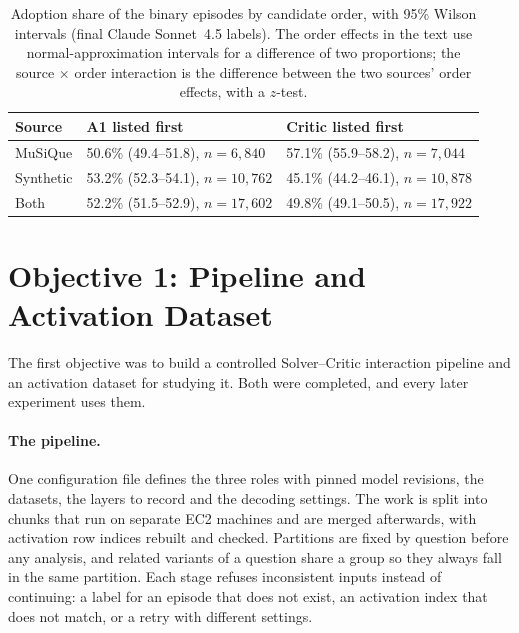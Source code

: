 \begin{table}[htbp]
    \centering
    \caption{Adoption share of the binary episodes by candidate order, with
    95\% Wilson intervals (final Claude Sonnet~4.5 labels). The order effects
    in the text use normal-approximation intervals for a difference of two
    proportions; the source $\times$ order interaction is the difference
    between the two sources' order effects, with a $z$-test.}
    \label{tab:order-final}
    \begin{tabular}{lll}
        \toprule
        Source & A1 listed first & Critic listed first \\
        \midrule
        MuSiQue   & 50.6\% (49.4--51.8), $n = 6{,}840$  & 57.1\% (55.9--58.2), $n = 7{,}044$ \\
        Synthetic & 53.2\% (52.3--54.1), $n = 10{,}762$ & 45.1\% (44.2--46.1), $n = 10{,}878$ \\
        Both      & 52.2\% (51.5--52.9), $n = 17{,}602$ & 49.8\% (49.1--50.5), $n = 17{,}922$ \\
        \bottomrule
    \end{tabular}
\end{table}

\section{Objective 1: Pipeline and Activation Dataset}
\label{sec:results-objective1}

The first objective was to build a controlled Solver--Critic interaction
pipeline and an activation dataset for studying it. Both were completed, and
every later experiment uses them.

\paragraph{The pipeline.} One configuration file defines the three roles with
pinned model revisions, the datasets, the layers to record and the decoding
settings. The work is split into chunks that run on separate EC2 machines and
are merged afterwards, with activation row indices rebuilt and checked.
Partitions are fixed by question before any analysis, and related variants of
a question share a group so they always fall in the same partition. Each
stage refuses inconsistent inputs instead of continuing: a label for an
episode that does not exist, an activation index that does not match, or a
retry with different settings.

